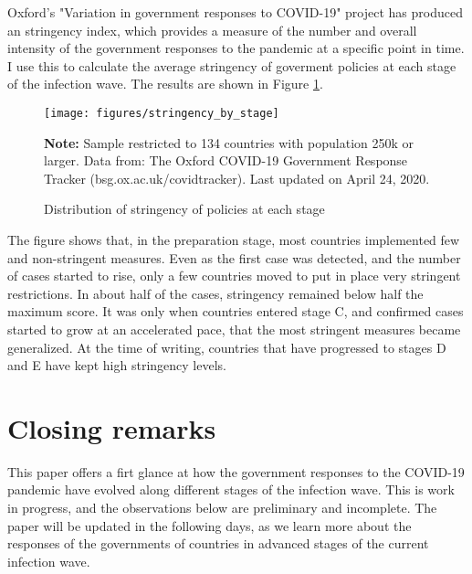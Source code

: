 \documentclass[12pt,english]{article}
\begin{document}
Oxford's "Variation in government responses to COVID-19" project has produced an stringency index, which provides a measure of the number and overall intensity of the government responses to the pandemic at a specific point in time.  I use this to calculate the average stringency of goverment policies at each stage of the infection wave.  The results are shown in Figure \ref{fig:stringency}.

\begin{figure}[H]
	\singlespacing
	\centering
	 \caption{Distribution of stringency of policies at each stage}  \label{fig:stringency}
	\resizebox{0.7\width}{!} {
		\begin{threeparttable}

 			  \texttt{[image: figures/stringency\_by\_stage]}
  			 \begin{tablenotes}[flushleft]\vspace*{-7bp}
			\item \textbf{Note:} Sample restricted to 134 countries with population 250k or larger. Data from: The Oxford COVID-19 Government Response Tracker (bsg.ox.ac.uk/covidtracker). Last updated on April 24, 2020.
			 \end{tablenotes}
  		\end{threeparttable}
 		}
  	 \onehalfspacing
\end{figure}

The figure shows that, in the preparation stage, most countries implemented few and non-stringent measures.  Even as the first case was detected, and the number of cases started to rise, only a few countries moved to put in place very stringent restrictions.  In about half of the cases, stringency remained below half the maximum score.  It was only when countries entered stage C, and confirmed cases started to grow at an accelerated pace, that the most stringent measures became generalized.  At the time of writing, countries that have progressed to stages D and E have kept high stringency levels.


\section{Closing remarks\label{sec:Conclusion}}

This paper offers a firt glance at how the government responses to the COVID-19 pandemic have evolved along different stages of the infection wave.  This is work in progress, and the observations below are preliminary and incomplete.  The paper will be updated in the following days, as we learn more about the responses of the governments of countries in advanced stages of the current infection wave.
\end{document}
